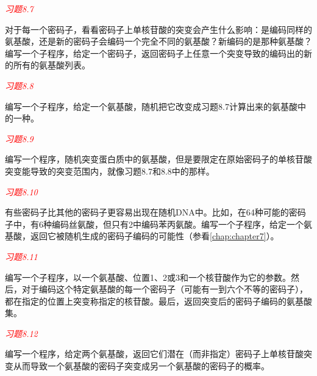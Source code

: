 \textcolor{red}{\textit{习题8.7}}
\begin{adjustwidth}{1cm}{}
对于每一个密码子，看看密码子上单核苷酸的突变会产生什么影响：是编码同样的氨基酸，还是新的密码子会编码一个完全不同的氨基酸？新编码的是那种氨基酸？编写一个子程序，给定一个密码子，返回密码子上任意一个突变导致的编码出的新的所有的氨基酸列表。
\end{adjustwidth}

\textcolor{red}{\textit{习题8.8}}
\begin{adjustwidth}{1cm}{}
编写一个子程序，给定一个氨基酸，随机把它改变成习题8.7计算出来的氨基酸中的一种。
\end{adjustwidth}

\textcolor{red}{\textit{习题8.9}}
\begin{adjustwidth}{1cm}{}
编写一个程序，随机突变蛋白质中的氨基酸，但是要限定在原始密码子的单核苷酸突变能导致的突变范围内，就像习题8.7和8.8中的那样。
\end{adjustwidth}

\textcolor{red}{\textit{习题8.10}}
\begin{adjustwidth}{1cm}{}
有些密码子比其他的密码子更容易出现在随机DNA中。比如，在64种可能的密码子中，有6种编码丝氨酸，但只有2中编码苯丙氨酸。编写一个子程序，给定一个氨基酸，返回它被随机生成的密码子编码的可能性（参看\autoref{chap:chapter7}）。
\end{adjustwidth}

\textcolor{red}{\textit{习题8.11}}
\begin{adjustwidth}{1cm}{}
编写一个子程序，以一个氨基酸、位置1、2或3和一个核苷酸作为它的参数。然后，对于编码这个特定氨基酸的每一个密码子（可能有一到六个不等的密码子），都在指定的位置上突变称指定的核苷酸。最后，返回突变后的密码子编码的氨基酸集。
\end{adjustwidth}

\textcolor{red}{\textit{习题8.12}}
\begin{adjustwidth}{1cm}{}
编写一个程序，给定两个氨基酸，返回它们潜在（而非指定）密码子上单核苷酸突变从而导致一个氨基酸的密码子突变成另一个氨基酸的密码子的概率。
\end{adjustwidth}

